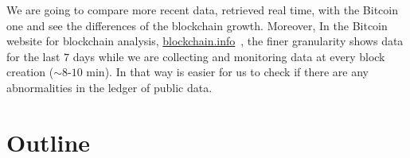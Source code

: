 \documentclass[USenglish]{uit-thesis}
\begin{document}
We are going to compare more recent data, retrieved real time, with the Bitcoin one and see the differences of the
blockchain growth. Moreover, In the Bitcoin website for blockchain analysis,
\url{blockchain.info}~\cite{bitcoin_blockchain}, the finer granularity
shows data for the last $7$ days while we are collecting and monitoring data
at every block creation ($\sim8$-$10$ min). In that way is easier for us to check
if there are any abnormalities in the ledger of public data.

\section{Outline}
\label{sec:outline}

\end{document}
